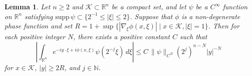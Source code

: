 \documentclass[12pt]{amsart}
\numberwithin{equation}{section}
\theoremstyle{plain}
\newtheorem{lem}[thm]{Lemma}
\theoremstyle{definition}
\newcommand{\N}{\mathbb{N}}
\newcommand{\R}{\mathbb{R}}
\newcommand{\calK}{\mathcal{K}}
\newcommand{\supp}{\mathrm{supp}\, }
\begin{document}
\begin{lem}\label{lem-220925}
Let $n\ge 2$ and $\calK \subset \R^n$ be a compact set, 
and let $\psi$ be a $C^{\infty}$ function on $\R^n$ 
satisfying $\supp \psi \subset \{2^{-1}\le |\xi|\le 2\}$.
Suppose that 
$\phi$ is a non-degenerate phase function 
and set 
$R = 1+ \sup \big\{ |\nabla_{\xi} \phi (x, \xi)| \mid x \in \calK, |\xi|=1 \big\}$.  
Then for each positive integer $N$, 
there  exists a positive constant $C$ 
such that 
\[
\left| \int_{\R^n} e^{-i y \cdot \xi + i \phi (x, \xi)} 
\psi (2^{-j}\xi) \,d\xi \right| 
\le C \,
\|\psi\|_{C^N} (2^j)^{n-N} |y|^{-N} 
\]
for $x \in \calK$, $|y| \ge 2R$, and $j\in \N$. 
\end{lem}
\end{document}
